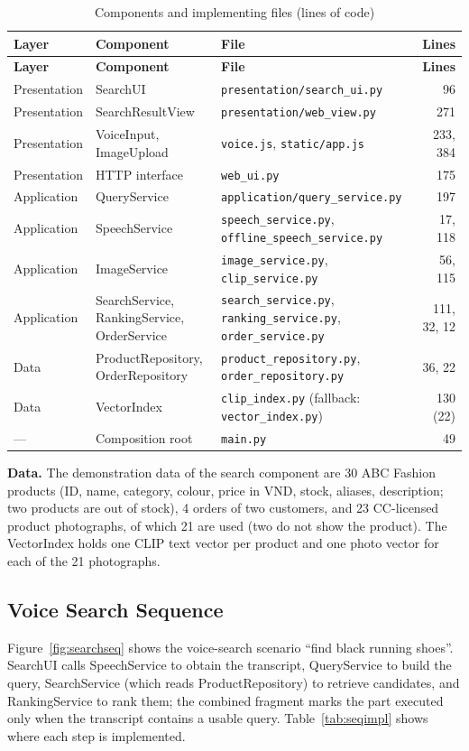 {\small
\begin{xltabular}{\textwidth}{@{}L{2.2cm} L{3.4cm} Y r@{}}
\caption{Components and implementing files (lines of code)}\label{tab:searchfiles}\\
\toprule
\textbf{Layer} & \textbf{Component} & \textbf{File} & \textbf{Lines} \\ \midrule
\endfirsthead
\toprule
\textbf{Layer} & \textbf{Component} & \textbf{File} & \textbf{Lines} \\ \midrule
\endhead
\bottomrule
\endlastfoot
Presentation & SearchUI & \texttt{presentation/search\_ui.py} & 96 \\
Presentation & SearchResultView & \texttt{presentation/web\_view.py} & 271 \\
Presentation & VoiceInput, ImageUpload & \texttt{voice.js}, \texttt{static/app.js} & 233, 384 \\
Presentation & HTTP interface & \texttt{web\_ui.py} & 175 \\
Application & QueryService & \texttt{application/query\_service.py} & 197 \\
Application & SpeechService & \texttt{speech\_service.py}, \texttt{offline\_speech\_service.py} & 17, 118 \\
Application & ImageService & \texttt{image\_service.py}, \texttt{clip\_service.py} & 56, 115 \\
Application & SearchService, RankingService, OrderService & \texttt{search\_service.py}, \texttt{ranking\_service.py}, \texttt{order\_service.py} & 111, 32, 12 \\
Data & ProductRepository, OrderRepository & \texttt{product\_repository.py}, \texttt{order\_repository.py} & 36, 22 \\
Data & VectorIndex & \texttt{clip\_index.py} (fallback: \texttt{vector\_index.py}) & 130 (22) \\
--- & Composition root & \texttt{main.py} & 49 \\
\end{xltabular}
}

\textbf{Data.} The demonstration data of the search component are 30 ABC Fashion products (ID, name, category, colour, price in VND, stock, aliases, description; two products are out of stock), 4 orders of two customers, and 23 CC-licensed product photographs, of which 21 are used (two do not show the product). The VectorIndex holds one CLIP text vector per product and one photo vector for each of the 21 photographs.

\subsection{Voice Search Sequence}
\label{subsec:searchseq}
Figure~\ref{fig:searchseq} shows the voice-search scenario ``find black running shoes''. SearchUI calls SpeechService to obtain the transcript, QueryService to build the query, SearchService (which reads ProductRepository) to retrieve candidates, and RankingService to rank them; the combined fragment marks the part executed only when the transcript contains a usable query. Table~\ref{tab:seqimpl} shows where each step is implemented.

